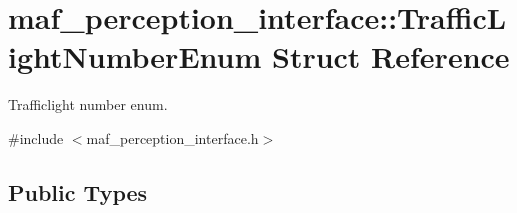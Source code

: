 \hypertarget{structmaf__perception__interface_1_1TrafficLightNumberEnum}{}\section{maf\+\_\+perception\+\_\+interface\+:\+:Traffic\+Light\+Number\+Enum Struct Reference}
\label{structmaf__perception__interface_1_1TrafficLightNumberEnum}


Trafficlight number enum.  




{\ttfamily \#include $<$maf\+\_\+perception\+\_\+interface.\+h$>$}

\subsection*{Public Types}
